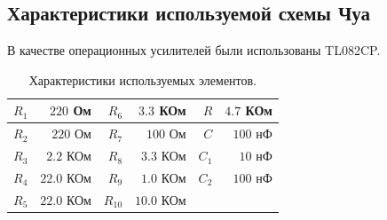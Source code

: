 \documentclass[12pt]{article}
\begin{document}
\subsection*{Характеристики используемой схемы Чуа}
В качестве операционных усилителей были использованы TL082CP.
\begin{table}[H]
	\centering
	\begin{tabular}{|r|r|r|r|r|r|}
		\hline
		$R_1$ & $220$ Ом   & $R_6$  & $3.3$ КОм  & $R$   & $4.7$ КОм \\ \hline
		$R_2$ & $220$ Ом   & $R_7$  & $100$ Ом   & $C$   & $100$ нФ  \\ \hline
		$R_3$ & $2.2$ КОм  & $R_8$  & $3.3$ КОм  & $C_1$ & $10$ нФ   \\ \hline
		$R_4$ & $22.0$ КОм & $R_9$  & $1.0$ КОм  & $C_2$ & $100$ нФ  \\ \hline
		$R_5$ & $22.0$ КОм & $R_{10}$ & $10.0$ КОм &       &           \\ \hline
	\end{tabular}
	\caption{Характеристики используемых элементов.}
	\label{tab:curcuit_chars}
\end{table}
\end{document}
